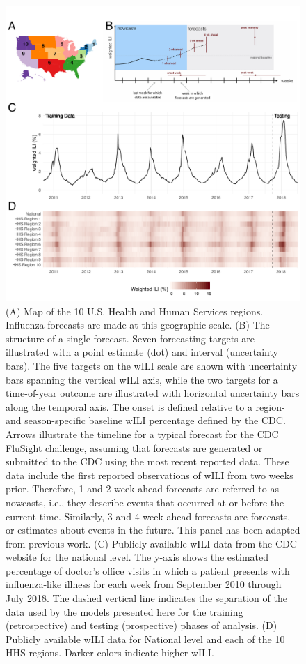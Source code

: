 \documentclass{article}\usepackage[]{graphicx}\usepackage[]{color}
\begin{document}
\begin{figure}[htbp]
\begin{center}
\includegraphics[width=\textwidth]{static-content/overview-figure-edited.pdf}
\caption{(A) Map of the 10 U.S. Health and Human Services regions. Influenza forecasts are made at this geographic scale. (B) The structure of a single forecast. Seven forecasting targets are illustrated with a point estimate (dot) and interval (uncertainty bars). The five targets on the wILI scale are shown with uncertainty bars spanning the vertical wILI axis, while the two targets for a time-of-year outcome are illustrated with horizontal uncertainty bars along the temporal axis. The onset is defined relative to a region- and season-specific baseline wILI percentage defined by the CDC.\cite{biggerstaff2018systematic} Arrows illustrate the timeline for a typical forecast for the CDC FluSight challenge, assuming that forecasts are generated or submitted to the CDC using the most recent reported data. These data include the first reported observations of wILI from two weeks prior. Therefore, 1 and 2 week-ahead forecasts are referred to as nowcasts, i.e., they describe events that occurred at or before the current time. Similarly, 3 and 4 week-ahead forecasts are forecasts, or estimates about events in the future. This panel has been adapted from previous work.\cite{reich2019collaborative} (C) Publicly available wILI data from the CDC website for the national level. The y-axis shows the estimated percentage of doctor's office visits in which a patient presents with influenza-like illness for each week from September 2010 through July 2018. The dashed vertical line indicates the separation of the data used by the models presented here for the training (retrospective) and testing (prospective) phases of analysis. (D) Publicly available wILI data for National level and each of the 10 HHS regions. Darker colors indicate higher wILI.}
\label{fig:overview-schematic}
\end{center}
\end{figure}
\end{document}
